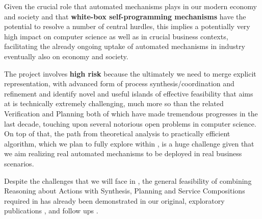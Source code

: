 Given the crucial role that automated mechanisms plays in our modern economy and society and that \textbf{white-box self-programming mechanisms} have the potential to resolve a number of central hurdles, %
this implies a potentially very high impact on computer science as well as in crucial  business contexts, facilitating the already ongoing uptake of automated mechanisms in industry eventually also on economy and society. 

The \project project involves \textbf{high risk} because the ultimately we need to merge explicit representation, with advanced form of process synthesis/coordination and refinement and  identify novel and useful islands of effective feasibility that \project aims at is technically extremely challenging, much more so than the related Verification and  Planning both of which have made tremendous progresses in the last decade, touching upon several notorious open problems in computer science. 
On top of that, the path from theoretical analysis to practically efficient algorithm, which we plan to fully explore within \project, is a huge challenge given that we aim realizing real automated mechanisms to be deployed in real business scenarios. 

Despite the challenges that we will face in \project, the general feasibility of combining Reasoning about Actions with Synthesis, Planning and Service Compositions required in \project has already been demonstrated in our original, exploratory publications \cite{IJCAI13,IJCAI15,IJCAI16,BPM,AIJ13,AIJ14}, and follow ups \cite{IJCAI15,AAAI17,}. 



